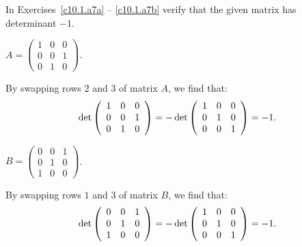 \documentclass{ximera}
\begin{document}
\noindent In Exercises~\ref{c10.1.a7a} -- \ref{c10.1.a7b} verify 
that the given matrix has determinant $-1$.
\begin{exercise} \label{c10.1.a7a}
$A = \left( \begin{array}{rrr}
1  &  0  &  0\\
0  &  0  &  1\\
0  &  1  &  0
\end{array} \right)$.

\begin{solution}

By swapping rows $2$ and $3$ of matrix $A$, we find that:
\[
\det\left(\begin{array}{rrr} 1 & 0 & 0 \\ 0 & 0 & 1 \\ 0 & 1 & 0\end{array}\right) =
-\det\left(\begin{array}{rrr} 1 & 0 & 0 \\ 0 & 1 & 0 \\ 0 & 0 & 1\end{array}\right) = -1. \\
\]

\end{solution}
\end{exercise}
\begin{exercise} \label{c10.1.a7b}
$B = \left( \begin{array}{rrr}
 0 &   0 &   1\\
 0 &   1 &   0\\
 1 &   0 &   0
\end{array} \right)$.

\begin{solution}

By swapping rows $1$ and $3$ of matrix $B$, we find that:
\[
\det\left(\begin{array}{rrr} 0 & 0 & 1 \\ 0 & 1 & 0 \\ 1 & 0 & 0\end{array}\right) =
-\det\left(\begin{array}{rrr} 1 & 0 & 0 \\ 0 & 1 & 0 \\ 0 & 0 & 1\end{array}\right) = -1.
\]


\end{solution}
\end{exercise}
\end{document}
